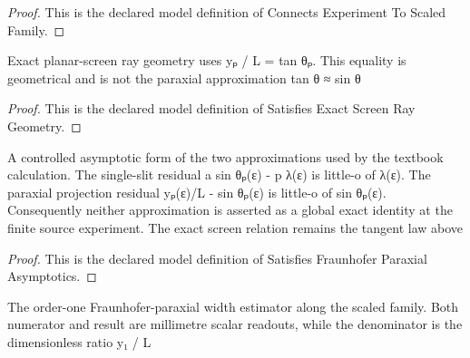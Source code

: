 \begin{proof}
  This is the declared model definition of Connects Experiment To Scaled Family.
\end{proof}
\begin{definition}
  \label{def:physics:phyx-mini-0249:phyxminiproblems-problemphyxmini0249-satisfiesexactscreenraygeometry}
  Exact planar-screen ray geometry uses yₚ / L = tan θₚ. This equality is geometrical and is not the paraxial approximation tan θ ≈ sin θ
\end{definition}
\begin{proof}
  This is the declared model definition of Satisfies Exact Screen Ray Geometry.
\end{proof}
\begin{definition}
  \label{def:physics:phyx-mini-0249:phyxminiproblems-problemphyxmini0249-satisfiesfraunhoferparaxialasymptotics}
  A controlled asymptotic form of the two approximations used by the textbook calculation. The single-slit residual a sin θₚ(ε) - p λ(ε) is little-o of λ(ε). The paraxial projection residual yₚ(ε)/L - sin θₚ(ε) is little-o of sin θₚ(ε). Consequently neither approximation is asserted as a global exact identity at the finite source experiment. The exact screen relation remains the tangent law above
\end{definition}
\begin{proof}
  This is the declared model definition of Satisfies Fraunhofer Paraxial Asymptotics.
\end{proof}
\begin{definition}
  \label{def:physics:phyx-mini-0249:phyxminiproblems-problemphyxmini0249-widthestimateprofileinmillimeters}
  The order-one Fraunhofer-paraxial width estimator along the scaled family. Both numerator and result are millimetre scalar readouts, while the denominator is the dimensionless ratio y₁ / L
\end{definition}
